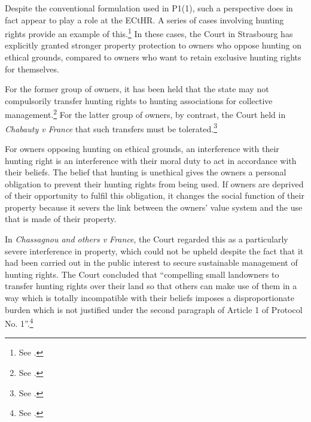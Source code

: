 Despite the conventional formulation used in P1(1), such a perspective does in fact appear to play a role at the ECtHR. A series of cases involving hunting rights provide an example of this.\footnote{See \cite{chassagnou99,hermann12,chabauty12}.} In these cases, the Court in Strasbourg has explicitly granted stronger property protection to owners who oppose hunting on ethical grounds, compared to owners who want to retain exclusive hunting rights for themselves.

For the former group of owners, it has been held that the state may not compulsorily transfer hunting rights to hunting associations for collective management.\footnote{See \cite{chassagnou99, hermann12}.} For the latter group of owners, by contrast, the Court held in {\it Chabauty v France} that such transfers must be tolerated.\footnote{See \cite{chabauty12}.}

For owners opposing hunting on ethical grounds, an interference with their hunting right is an interference with their moral duty to act in accordance with their beliefs. The belief that hunting is unethical gives the owners a personal obligation to prevent their hunting rights from being used. If owners are deprived of their opportunity to fulfil this obligation, it changes the social function of their property because it severs the link between the owners' value system and the use that is made of their property.

In {\it Chassagnou and others v France}, the Court regarded this as a particularly severe interference in property, which could not be upheld despite the fact that it had been carried out in the public interest to secure sustainable management of hunting rights. The Court concluded that ``compelling small landowners to transfer hunting rights over their land so that others can make use of them in a way which is totally incompatible with their beliefs imposes a disproportionate burden which is not justified under the second paragraph of Article 1 of Protocol No. 1''.\footnote{See \cite[85]{chassagnou99}.}

